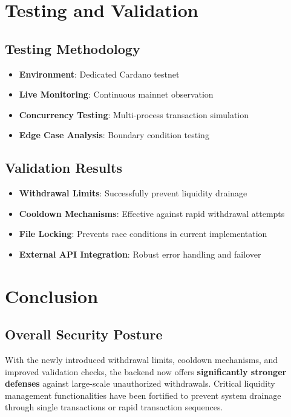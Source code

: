 \documentclass[11pt,a4paper]{article}
\begin{document}
\section{Testing and Validation}

\subsection{Testing Methodology}
\begin{itemize}
    \item \textbf{Environment}: Dedicated Cardano testnet
    \item \textbf{Live Monitoring}: Continuous mainnet observation
    \item \textbf{Concurrency Testing}: Multi-process transaction simulation
    \item \textbf{Edge Case Analysis}: Boundary condition testing
\end{itemize}

\subsection{Validation Results}
\begin{itemize}
    \item \textbf{Withdrawal Limits}: Successfully prevent liquidity drainage
    \item \textbf{Cooldown Mechanisms}: Effective against rapid withdrawal attempts
    \item \textbf{File Locking}: Prevents race conditions in current implementation
    \item \textbf{External API Integration}: Robust error handling and failover
\end{itemize}

\section{Conclusion}

\subsection{Overall Security Posture}
With the newly introduced withdrawal limits, cooldown mechanisms, and improved validation checks, the backend now offers \textbf{significantly stronger defenses} against large-scale unauthorized withdrawals. Critical liquidity management functionalities have been fortified to prevent system drainage through single transactions or rapid transaction sequences.
\end{document}
